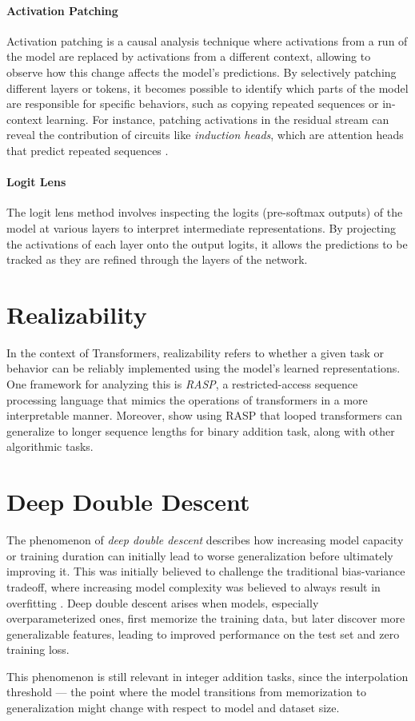 \paragraph{Activation Patching}
Activation patching \parencite{zhang_towards_2023} is a causal analysis technique where activations from a run of the model are replaced by activations from a different context, allowing to observe how this change affects the model's predictions. By selectively patching different layers or tokens, it becomes possible to identify which parts of the model are responsible for specific behaviors, such as copying repeated sequences or in-context learning. For instance, patching activations in the residual stream can reveal the contribution of circuits like \emph{induction heads}, which are attention heads that predict repeated sequences \parencite{olsson_-context_2022}.

\paragraph{Logit Lens}
The logit lens method \parencite{nostalgebraist_interpreting_2020} involves inspecting the logits (pre-softmax outputs) of the model at various layers to interpret intermediate representations. By projecting the activations of each layer onto the output logits, it allows the predictions to be tracked as they are refined through the layers of the network.

\section{Realizability}\label{sec:realizability}

In the context of Transformers, realizability refers to whether a given task or behavior can be reliably implemented using the model's learned representations. One framework for analyzing this is \emph{RASP}, a restricted-access sequence processing language \parencite{weiss_thinking_2021} that mimics the operations of transformers in a more interpretable manner. Moreover, \cite{fan_looped_2024} show using RASP that looped transformers can generalize to longer sequence lengths for binary addition task, along with other algorithmic tasks.

\section{Deep Double Descent}\label{sec:deep_double_descent}

The phenomenon of \emph{deep double descent} describes how increasing model capacity or training duration can initially lead to worse generalization before ultimately improving it. This was initially believed to challenge the traditional bias-variance tradeoff, where increasing model complexity was believed to always result in overfitting \parencite{belkin_reconciling_2019, nakkiran_deep_2021}. Deep double descent arises when models, especially overparameterized ones, first memorize the training data, but later discover more generalizable features, leading to improved performance on the test set and zero training loss.

This phenomenon is still relevant in integer addition tasks, since the interpolation threshold — the point where the model transitions from memorization to generalization might change with respect to model and dataset size.
